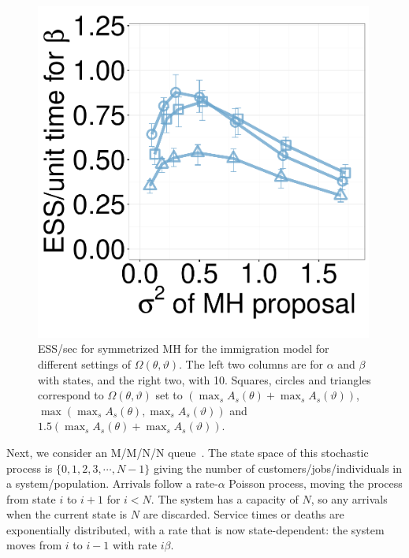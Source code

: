 \begin{figure}[H]
\begin{minipage}[hp]{0.24\linewidth}
	\end{minipage}
  \begin{minipage}[hp]{0.24\linewidth}
  \centering
    \includegraphics [width=0.99\textwidth, angle=0]{figs/new_whole_exp_figs/mh_q_beta_dim10.pdf}
	\end{minipage}
    \caption{ESS/sec for symmetrized MH for the immigration model for different settings of $\Omega(\theta,\vartheta)$. The left two columns are for $\alpha$ and $\beta$ with states, and the right two, with 10. 
    Squares, circles and triangles correspond to $\Omega(\theta,\vartheta)$ set to $(\max_s A_s(\theta) + \max_s A_s(\vartheta))$, $\max(\max_s A_s(\theta), \max_s A_s(\vartheta))$ and  $1.5(\max_s A_s(\theta) + \max_s A_s(\vartheta))$.
  }
    \label{fig:mhESS_Q}
  \end{figure}


Next, we consider an M/M/N/N queue~\citep{gross2011fundamentals}. 
The state space of this stochastic process is $\{0, 1, 2, 3, \cdots, N - 1\}$ giving the number of customers/jobs/individuals in a system/population. 
Arrivals follow a rate-$\alpha$ Poisson process, moving the process from state 
$i$ to $i+1$ for $i<N$. The system has a capacity of $N$, so any arrivals when 
the current state is $N$ are discarded.  Service times or deaths are 
exponentially distributed, with a rate that is now state-dependent:
the system moves from $i$ to $i - 1$ with rate $i\beta$. 

